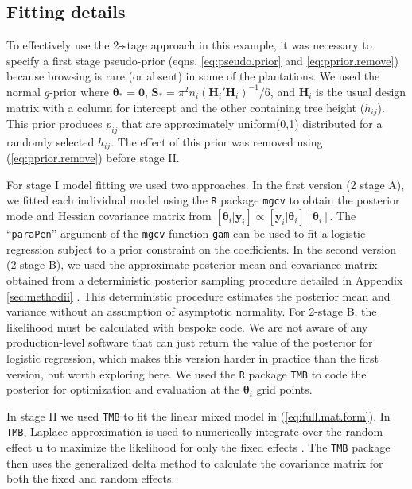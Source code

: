 \documentclass[12pt]{article}
\newcommand{\by}{\mathbf{y}}
\newcommand{\bt}{\boldsymbol{\theta}}
\newcommand{\bS}{\mathbf{S}}
\newcommand{\bu}{\mathbf{u}}
\begin{document}
\subsection{Fitting details}

To effectively use the 2-stage approach in this example, it was necessary to specify a first stage pseudo-prior (eqns. \ref{eq:pseudo.prior} and \ref{eq:pprior.remove}) because browsing is rare (or absent) in some of the plantations. We used the normal $g$-prior \citep{hanson2014informative} where $\bt_* = \mathbf{0}$, $\bS_* = \pi^2 n_i (\mathbf{H}_i'\mathbf{H}_i)^{-1}/6$, and $\mathbf{H}_i$ is the usual design matrix with a column for intercept and the other containing tree height ($h_{ij}$). This prior produces $p_{ij}$ that are approximately uniform(0,1) distributed for a randomly selected  $h_{ij}$. The effect of this prior was removed using (\ref{eq:pprior.remove}) before stage II.

For stage I model fitting we used two approaches. In the first version (2 stage A), we fitted each individual model using the {\tt R} package {\tt mgcv} \citep{wood2011fast} to obtain the posterior mode and Hessian covariance matrix from $[\bt_i|\by_i] \propto [\by_i|\bt_i][\bt_i]$. The ``{\tt paraPen}'' argument of the {\tt mgcv} function {\tt gam} can be used to fit a logistic regression subject to a prior constraint on the coefficients. In the second version (2 stage B), we used the approximate posterior mean and covariance matrix obtained from a deterministic posterior sampling procedure detailed in Appendix \ref{sec:methodii} \citep{johnson2011bayesian}. This deterministic procedure estimates the posterior mean and variance without an assumption of asymptotic normality. For 2-stage B, the likelihood must be calculated with bespoke code. We are not aware of any production-level software that can just return the value of the posterior for logistic regression, which makes this version harder in practice than the first version, but worth exploring here. We used the {\tt R} package {\tt TMB} to code the posterior for optimization and evaluation at the $\bt_i$ grid points. 

In stage II we used {\tt TMB} to fit the linear mixed model in (\ref{eq:full.mat.form}). In {\tt TMB}, Laplace approximation is used to numerically integrate over the random effect $\bu$ to maximize the likelihood for only the fixed effects \citep{kristensen2016tmb}. The {\tt TMB} package then uses the generalized delta method to calculate the covariance matrix for both the fixed and random effects. 
\end{document}
